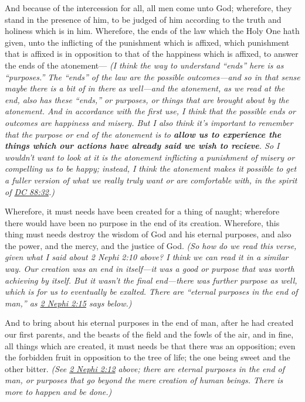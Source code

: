 \begin{compactdesc}
			\item[2 Nephi 2:10] And because of the intercession for all, all men come unto God; wherefore, they stand in the presence of him, to be judged of him according to the truth and holiness which is in him. Wherefore, the ends of the law which the Holy One hath given, unto the inflicting of the punishment which is affixed, which punishment that is affixed is in opposition to that of the happiness which is affixed, to answer the ends of the atonement--- \textit{(I think the way to understand ``ends'' here is as ``purposes.'' The ``ends'' of the law are the possible outcomes---and so in that sense maybe there is a bit of  in there as well---and the atonement, as we read at the end, also has these ``ends,'' or purposes, or things that are brought about by the atonement. And in accordance with the first use, I think that the possible ends or outcomes are happiness and misery. But I also think it's important to remember that the purpose or end of the atonement is to \textbf{allow us to experience the things which our actions have already said we wish to recieve}. So I wouldn't want to look at it is the atonement inflicting a punishment of misery or compelling us to be happy; instead, I think the atonement makes it possible to get a fuller version of what we really truly want or are comfortable with, in the spirit of \hyperref[DC88-32]{DC 88:32}.)}
			\item[2 Nephi 2:12] Wherefore, it must needs have been created for a thing of naught; wherefore there would have been no purpose in the end of its creation. Wherefore, this thing must needs destroy the wisdom of God and his eternal purposes, and also the power, and the mercy, and the justice of God. \textit{(So how do we read this verse, given what I said about 2 Nephi 2:10 above? I think we can read it in a similar way. Our creation was an end in itself---it was a good or purpose that was worth achieving by itself. But it wasn't the final end---there was further purpose as well, which is for us to eventually be exalted. There are ``eternal purposes in the end of man,'' as \hyperref[2NEPHI-2-15]{2 Nephi 2:15} says below.)}
			\item[2 Nephi 2:15] And to bring about his eternal purposes in the end of man, after he had created our first parents, and the beasts of the field and the fowls of the air, and in fine, all things which are created, it must needs be that there was an opposition; even the forbidden fruit in opposition to the tree of life; the one being sweet and the other bitter. \textit{(See \hyperref[2NEPHI-2-12]{2 Nephi 2:12} above; there are eternal purposes in the end of man, or purposes that go beyond the mere creation of human beings. There is more to happen and be done.)}

\end{compactdesc}
